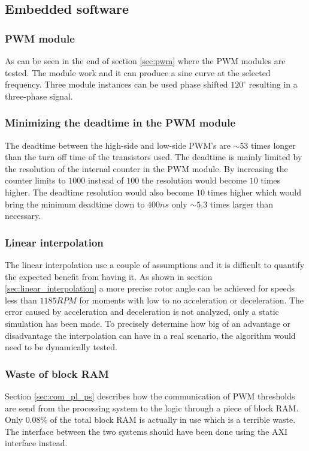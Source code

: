 

\subsection{Embedded software}
\subsubsection{PWM module}
As can be seen in the end of section \ref{sec:pwm} where the PWM modules are tested. The module work and it can produce a sine curve at the selected frequency. Three module instances can be used phase shifted $120^\circ$ resulting in a three-phase signal.

\subsubsection{Minimizing the deadtime in the PWM module}
The deadtime between the high-side and low-side PWM's are $\sim 53$ times longer than the turn off time of the transistors used. The deadtime is mainly limited by the resolution of the internal counter in the PWM module. By increasing the counter limits to $1000$ instead of $100$ the resolution would become $10$ times higher. The deadtime resolution would also become $10$ times higher which would bring the minimum deadtime down to $400ns$ only $\sim 5.3$ times larger than necessary.

\subsubsection{Linear interpolation}

The linear interpolation use a couple of assumptions and it is difficult to quantify the expected benefit from having it. As shown in section \ref{sec:linear_interpolation} a more precise rotor angle can be achieved for speeds less than $1185RPM$ for moments with low to no acceleration or deceleration. The error caused by acceleration and deceleration is not analyzed, only a static simulation has been made. To precisely determine how big of an advantage or disadvantage the interpolation can have in a real scenario, the algorithm would need to be dynamically tested.

\subsubsection{Waste of block RAM}
Section \ref{sec:com_pl_ps} describes how the communication of PWM thresholds are send from the processing system to the logic through a piece of block RAM. Only $0.08\%$ of the total block RAM is actually in use which is a terrible waste. The interface between the two systems should have been done using the AXI interface instead.


 
 